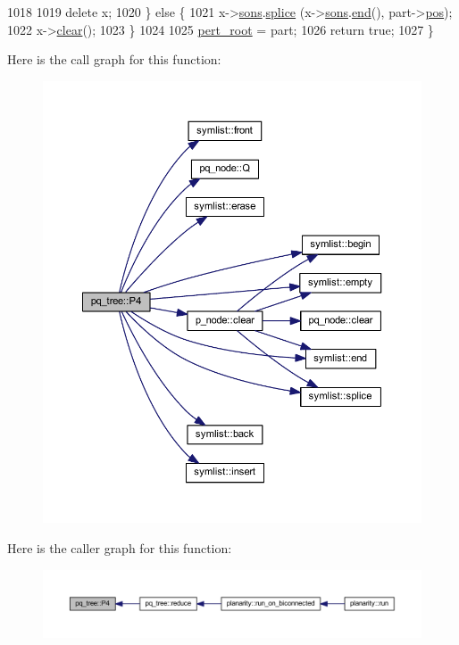 \begin{DoxyCode}
1018     
1019     \textcolor{keyword}{delete} x; 
1020     \} \textcolor{keywordflow}{else} \{
1021     x->\mbox{\hyperlink{classpq__node_a2cc030cfa4560872acea8b50ebd0542b}{sons}}.\mbox{\hyperlink{classsymlist_ac2bd4d9db62ea6a3282662c62a97c3b2}{splice}} (x->\mbox{\hyperlink{classpq__node_a2cc030cfa4560872acea8b50ebd0542b}{sons}}.\mbox{\hyperlink{classsymlist_a7283589fa01f79d722f8256d7a6a7883}{end}}(), part->\mbox{\hyperlink{classpq__node_a5e8a5defa0fec4ff2e82fabee97296b4}{pos}});
1022     x->\mbox{\hyperlink{classp__node_af24fe11743b0836b03c108a1bf8a0995}{clear}}();
1023     \}
1024     
1025     \mbox{\hyperlink{classpq__tree_adf0d16ca5a29bfbe863efb525135ac01}{pert\_root}} = part;
1026     \textcolor{keywordflow}{return} \textcolor{keyword}{true};
1027 \}
\end{DoxyCode}
Here is the call graph for this function\+:\nopagebreak
\begin{figure}[H]
\begin{center}
\leavevmode
\includegraphics[width=350pt]{classpq__tree_aacac6fd2b8e973b98f961e91285540f0_cgraph}
\end{center}
\end{figure}
Here is the caller graph for this function\+:\nopagebreak
\begin{figure}[H]
\begin{center}
\leavevmode
\includegraphics[width=350pt]{classpq__tree_aacac6fd2b8e973b98f961e91285540f0_icgraph}
\end{center}
\end{figure}
\mbox{\label{classpq__tree_a274efe525064f511488091d318f1588e}} 
